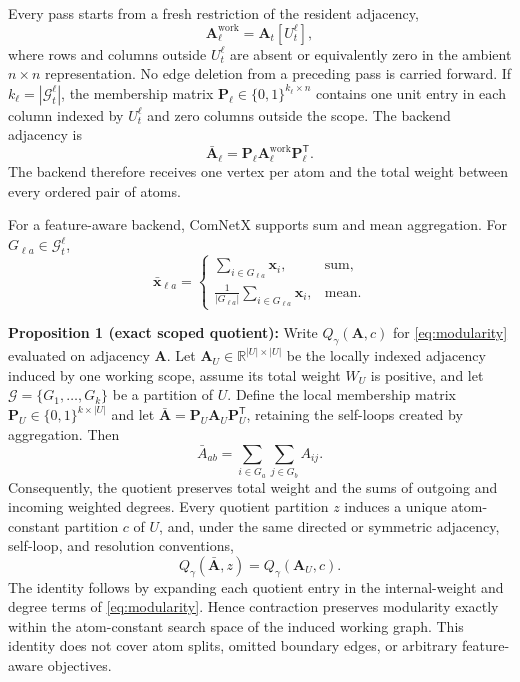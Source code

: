 \documentclass{ieeeaccess}
\begin{document}
Every pass starts from a fresh restriction of the resident adjacency,
\begin{equation}
\bm{A}^{\mathrm{work}}_\ell=\bm{A}_t[U_t^\ell],
\label{eq:u0adj}
\end{equation}
where rows and columns outside $U_t^\ell$ are absent or equivalently zero in
the ambient $n\times n$ representation. No edge deletion from a preceding
pass is carried forward. If $k_\ell=|\mathcal{G}_t^\ell|$, the membership
matrix $\bm{P}_\ell\in\{0,1\}^{k_\ell\times n}$ contains one unit entry in
each column indexed by $U_t^\ell$ and zero columns outside the scope. The
backend adjacency is
\begin{equation}
\bar{\bm{A}}_\ell=\bm{P}_\ell
\bm{A}^{\mathrm{work}}_\ell\bm{P}_\ell^{\mathsf T}.
\label{eq:aggregate}
\end{equation}
The backend therefore receives one vertex per atom and the total weight
between every ordered pair of atoms.

For a feature-aware backend, ComNetX supports sum and mean aggregation. For
$G_{\ell a}\in\mathcal{G}_t^\ell$,
\begin{equation}
\bar{\bm{x}}_{\ell a}=
\begin{cases}
\displaystyle\sum_{i\in G_{\ell a}}\bm{x}_i,
&\text{sum},\\[1mm]
\displaystyle\frac{1}{|G_{\ell a}|}
\sum_{i\in G_{\ell a}}\bm{x}_i,
&\text{mean}.
\end{cases}
\label{eq:features}
\end{equation}

\noindent\textbf{Proposition 1 (exact scoped quotient):} Write
$Q_\gamma(\bm A,c)$ for \eqref{eq:modularity} evaluated on adjacency $\bm A$.
Let $\bm A_U\in\mathbb{R}^{|U|\times|U|}$ be the locally indexed adjacency
induced by one working scope, assume its total weight $W_U$ is positive, and
let $\mathcal{G}=\{G_1,\ldots,G_k\}$ be a partition of $U$. Define the local
membership matrix $\bm P_U\in\{0,1\}^{k\times|U|}$ and let
$\bar{\bm A}=\bm P_U\bm A_U\bm P_U^{\mathsf T}$, retaining the self-loops
created by aggregation. Then
\begin{equation}
\bar A_{ab}=\sum_{i\in G_a}\sum_{j\in G_b}A_{ij}.
\label{eq:quotient_entries}
\end{equation}
Consequently, the quotient preserves total weight and the sums of outgoing and
incoming weighted degrees. Every quotient partition $z$ induces a unique
atom-constant partition $c$ of $U$, and, under the same directed or symmetric
adjacency, self-loop, and resolution conventions,
\begin{equation}
Q_\gamma(\bar{\bm A},z)=Q_\gamma(\bm A_U,c).
\label{eq:quotient_modularity}
\end{equation}
The identity follows by expanding each quotient entry in the internal-weight
and degree terms of \eqref{eq:modularity}. Hence contraction preserves
modularity exactly within the atom-constant search space of the induced working
graph. This identity does not cover atom splits, omitted boundary edges, or
arbitrary feature-aware objectives.
\end{document}
